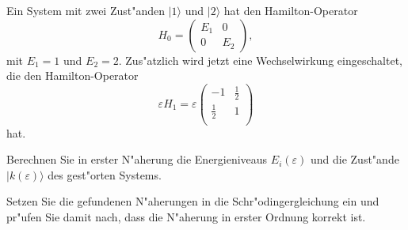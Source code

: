 Ein System mit zwei Zust"anden $|1\rangle$ und $|2\rangle$
hat den Hamilton-Operator
\[
H_0=\begin{pmatrix}
E_1&  0\\
  0&E_2
\end{pmatrix},
\]
mit $E_1=1$ und $E_2=2$.
Zus"atzlich wird jetzt eine Wechselwirkung eingeschaltet, die den
Hamilton-Operator
\[
\varepsilon H_1=
\varepsilon \begin{pmatrix}
     -1&\frac12\\
\frac12&      1\\
\end{pmatrix}
\]
hat.
\begin{teilaufgaben}
\item 
Berechnen Sie in erster N"aherung die Energieniveaus $E_i(\varepsilon)$
und die Zust"ande $|k(\varepsilon)\rangle$ des gest"orten Systems.
\item
Setzen Sie die gefundenen N"aherungen in die Schr"odingergleichung ein
und pr"ufen Sie damit nach, dass die N"aherung in erster Ordnung
korrekt ist.
\end{teilaufgaben}

